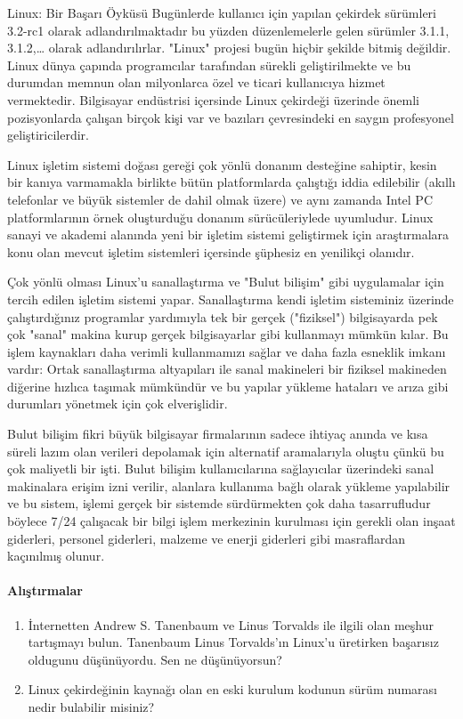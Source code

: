 \begin{section}{Linux: Bir Başarı Öyküsü}
Bugünlerde kullanıcı için yapılan çekirdek sürümleri 3.2-rc1 olarak adlandırılmaktadır bu yüzden düzenlemelerle gelen sürümler 3.1.1, 3.1.2,… olarak adlandırılırlar. "Linux" projesi bugün hiçbir şekilde bitmiş değildir. Linux dünya çapında programcılar tarafından sürekli geliştirilmekte ve bu  durumdan memnun olan milyonlarca özel ve ticari kullanıcıya hizmet vermektedir. Bilgisayar endüstrisi içersinde  Linux çekirdeği üzerinde  önemli pozisyonlarda çalışan birçok kişi var ve bazıları çevresindeki en saygın profesyonel geliştiricilerdir.

Linux işletim sistemi doğası gereği çok yönlü donanım desteğine sahiptir, kesin bir kanıya varmamakla birlikte bütün platformlarda çalıştığı iddia edilebilir (akıllı telefonlar ve büyük sistemler de dahil olmak üzere) ve aynı zamanda Intel PC platformlarının örnek oluşturduğu donanım sürücüleriylede uyumludur. Linux sanayi ve akademi alanında  yeni bir işletim sistemi geliştirmek için araştırmalara konu olan  mevcut işletim sistemleri içersinde şüphesiz en yenilikçi olanıdır.

Çok yönlü olması Linux'u sanallaştırma ve "Bulut bilişim" gibi uygulamalar için tercih edilen işletim sistemi yapar. Sanallaştırma kendi işletim sisteminiz üzerinde çalıştırdığınız programlar yardımıyla tek bir gerçek ("fiziksel") bilgisayarda  pek çok "sanal" makina kurup  gerçek bilgisayarlar gibi kullanmayı mümkün kılar. Bu işlem kaynakları daha verimli kullanmamızı sağlar ve daha fazla esneklik imkanı vardır: Ortak sanallaştırma altyapıları ile sanal makineleri bir fiziksel makineden diğerine hızlıca taşımak mümkündür ve bu yapılar yükleme hataları ve arıza gibi durumları yönetmek için çok elverişlidir.

Bulut bilişim fikri büyük bilgisayar firmalarının sadece ihtiyaç anında ve kısa süreli lazım olan verileri depolamak için alternatif aramalarıyla oluştu çünkü bu çok maliyetli bir işti. Bulut bilişim kullanıcılarına sağlayıcılar üzerindeki sanal makinalara erişim izni verilir, alanlara kullanıma bağlı olarak yükleme yapılabilir ve bu sistem, işlemi gerçek bir sistemde sürdürmekten çok daha tasarrufludur böylece 7/24 çalışacak bir bilgi işlem merkezinin kurulması için gerekli olan inşaat giderleri, personel giderleri, malzeme ve enerji giderleri gibi masraflardan kaçınılmış olunur.
\paragraph{{\Huge{\PencilLeftDown}}Alıştırmalar}{
\begin{enumerate}
 \item İnternetten Andrew S. Tanenbaum ve Linus Torvalds ile ilgili olan meşhur tartışmayı bulun. Tanenbaum Linus Torvalds'ın Linux'u üretirken başarısız oldugunu düşünüyordu. Sen ne düşünüyorsun?
 \item Linux çekirdeğinin kaynağı olan en eski kurulum kodunun sürüm numarası nedir bulabilir misiniz?
\end{enumerate}}
\end{section}
